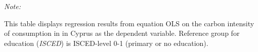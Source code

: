 \begin{table}[htbp!]
\begin{adjustbox}{width = 1\textwidth, max height = 0.95\textheight, center}
\begin{threeparttable}[b]
         \begin{tablenotes}\item \medskip \textit{Note:}
            \item This table displays regression results from equation OLS on the carbon intensity of consumption in  in Cyprus as the dependent variable. Reference group for education (\textit{ISCED}) is ISCED-level 0-1 (primary or no education).
         \end{tablenotes}
      \end{threeparttable}
   \end{adjustbox}
\end{table}


